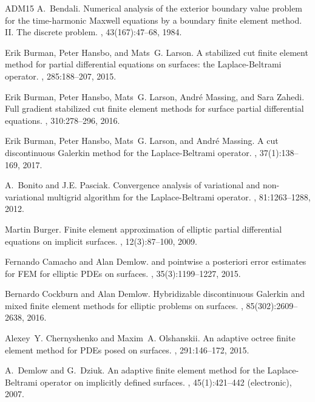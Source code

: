\documentclass{amsart}
\begin{document}
\begin{thebibliography}{ADM{\etalchar{+}}15}
A.~Bendali.
\newblock Numerical analysis of the exterior boundary value problem for the
  time-harmonic {M}axwell equations by a boundary finite element method. {II}.
  {T}he discrete problem.
, 43(167):47--68, 1984.

Erik Burman, Peter Hansbo, and Mats~G. Larson.
\newblock A stabilized cut finite element method for partial differential
  equations on surfaces: the {L}aplace-{B}eltrami operator.
, 285:188--207, 2015.

Erik Burman, Peter Hansbo, Mats~G. Larson, Andr\'{e} Massing, and Sara Zahedi.
\newblock Full gradient stabilized cut finite element methods for surface
  partial differential equations.
, 310:278--296, 2016.

Erik Burman, Peter Hansbo, Mats~G. Larson, and Andr\'{e} Massing.
\newblock A cut discontinuous {G}alerkin method for the {L}aplace-{B}eltrami
  operator.
, 37(1):138--169, 2017.

A.~Bonito and J.E. Pasciak.
\newblock Convergence analysis of variational and non-variational multigrid
  algorithm for the {L}aplace-{B}eltrami operator.
, 81:1263--1288, 2012.

Martin Burger.
\newblock Finite element approximation of elliptic partial differential
  equations on implicit surfaces.
, 12(3):87--100, 2009.

Fernando Camacho and Alan Demlow.
 and pointwise a posteriori error estimates for {FEM} for
  elliptic {PDE}s on surfaces.
, 35(3):1199--1227, 2015.

Bernardo Cockburn and Alan Demlow.
\newblock Hybridizable discontinuous {G}alerkin and mixed finite element
  methods for elliptic problems on surfaces.
, 85(302):2609--2638, 2016.

Alexey~Y. Chernyshenko and Maxim~A. Olshanskii.
\newblock An adaptive octree finite element method for {PDE}s posed on
  surfaces.
, 291:146--172, 2015.

A.~Demlow and G.~Dziuk.
\newblock An adaptive finite element method for the {L}aplace-{B}eltrami
  operator on implicitly defined surfaces.
, 45(1):421--442 (electronic), 2007.


\end{thebibliography}
\end{document}
